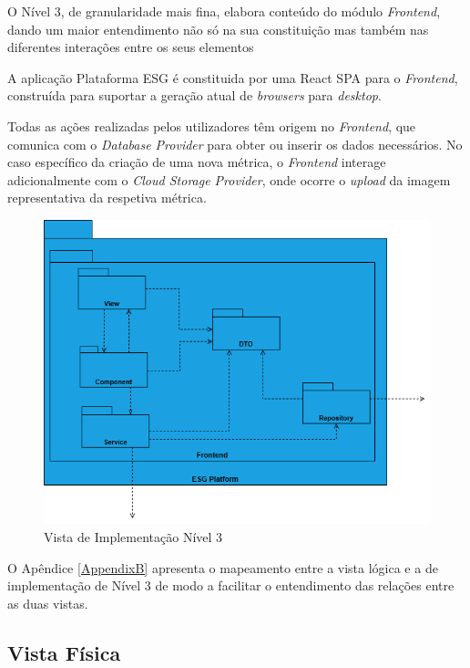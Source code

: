 O Nível 3, de granularidade mais fina, elabora conteúdo do módulo \textit{Frontend}, dando um maior  entendimento não só na sua constituição mas também nas diferentes interações entre os seus elementos 

A aplicação Plataforma ESG é constituida por uma React \gls{SPA} para o \textit{Frontend}, construída para suportar a geração atual de \textit{browsers} para \textit{desktop}.

Todas as ações realizadas pelos utilizadores têm origem no \textit{Frontend}, que comunica com o \textit{Database Provider} para obter ou inserir os dados necessários. No caso específico da criação de uma nova métrica, o \textit{Frontend} interage adicionalmente com o \textit{Cloud Storage Provider}, onde ocorre o \textit{upload} da imagem representativa da respetiva métrica.

\begin{figure}[H]
    \centering
    \includegraphics[width=5.25in,keepaspectratio]{frontmatter/assets/diagrams/Development View/Implementation Lv3.drawio.png}
    \caption{Vista de Implementação Nível 3}
    \label{fig:development_view_lv3}
\end{figure}

O Apêndice \ref{AppendixB} apresenta o mapeamento entre a vista lógica e a de implementação de Nível 3 de modo a facilitar o entendimento das relações entre as duas vistas.
    
\subsection{Vista Física}

